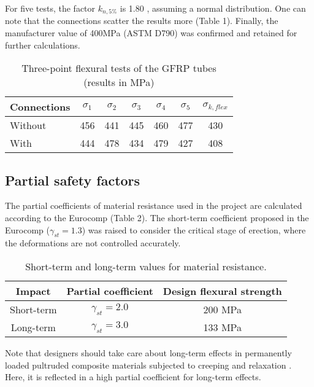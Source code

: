 For five tests, the factor $k_{n,5\%}$ is 1.80 , assuming a normal distribution. One can note that the connections scatter the results more (Table 1). Finally, the manufacturer value of 400MPa (ASTM D790) was confirmed and retained for further calculations.
\begin{table}[h]
\centering
\begin{tabular}{|l|c|c|c|c|c|c|}
\hline
Connections & $\sigma_1$ & $\sigma_2$ & $\sigma_3$ & $\sigma_4$ & $\sigma_5$ & $\sigma_{k,flex}$ \\
\hline
Without & 456 & 441 & 445 & 460 & 477 & 430 \\
\hline
With & 444 & 478 & 434 & 479 & 427 & 408 \\
\hline
\end{tabular}
\caption{Three-point flexural tests of the GFRP tubes (results in MPa)}
\label{tab:1}
\end{table}


\subsection{Partial safety factors}
The partial coefficients of material resistance used in the project are calculated according to the Eurocomp (Table 2). The short-term coefficient proposed in the Eurocomp ($\gamma_{st} = 1.3$) was raised to consider the critical stage of erection, where the deformations are not controlled accurately. 

\begin{table}[h]
\label{tab:2}
\centering
\begin{tabular}{|c|c|c|}
\hline
Impact & Partial coefficient & Design flexural strength \\
\hline
Short-term & $\gamma_{st} = 2.0$ & 200 MPa \\
\hline
Long-term & $\gamma_{st} = 3.0$ & 133 MPa\\
\hline
\end{tabular}
\caption{Short-term and long-term values for material resistance.}
\end{table}

Note that designers should take care about long-term effects in permanently loaded pultruded composite materials subjected to creeping and relaxation \citep{Kotelnikova-Weiler2012}. Here, it is reflected in a high partial coefficient for long-term effects.

